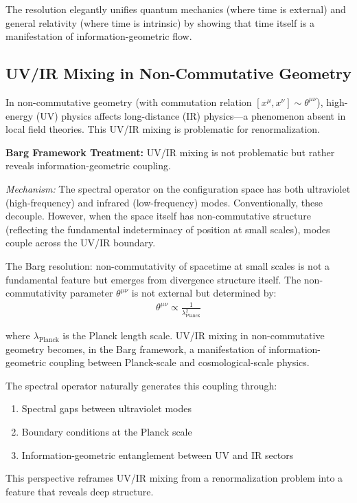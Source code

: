 \documentclass[12pt,a4paper]{article}
\begin{document}
The resolution elegantly unifies quantum mechanics (where time is external) and general relativity (where time is intrinsic) by showing that time itself is a manifestation of information-geometric flow.

\subsection{UV/IR Mixing in Non-Commutative Geometry}

In non-commutative geometry (with commutation relation $[x^\mu, x^\nu] \sim \theta^{\mu\nu}$), high-energy (UV) physics affects long-distance (IR) physics---a phenomenon absent in local field theories. This UV/IR mixing is problematic for renormalization.

\textbf{Barg Framework Treatment:} UV/IR mixing is not problematic but rather reveals information-geometric coupling.

\textit{Mechanism:} The spectral operator on the configuration space has both ultraviolet (high-frequency) and infrared (low-frequency) modes. Conventionally, these decouple. However, when the space itself has non-commutative structure (reflecting the fundamental indeterminacy of position at small scales), modes couple across the UV/IR boundary.

The Barg resolution: non-commutativity of spacetime at small scales is not a fundamental feature but emerges from divergence structure itself. The non-commutativity parameter $\theta^{\mu\nu}$ is not external but determined by:
\begin{align}
\theta^{\mu\nu} \propto \frac{1}{\lambda_{\text{Planck}}^2}
\end{align}

where $\lambda_{\text{Planck}}$ is the Planck length scale. UV/IR mixing in non-commutative geometry becomes, in the Barg framework, a manifestation of information-geometric coupling between Planck-scale and cosmological-scale physics.

The spectral operator naturally generates this coupling through:
\begin{enumerate}
\item Spectral gaps between ultraviolet modes
\item Boundary conditions at the Planck scale
\item Information-geometric entanglement between UV and IR sectors
\end{enumerate}

This perspective reframes UV/IR mixing from a renormalization problem into a feature that reveals deep structure.
\end{document}
